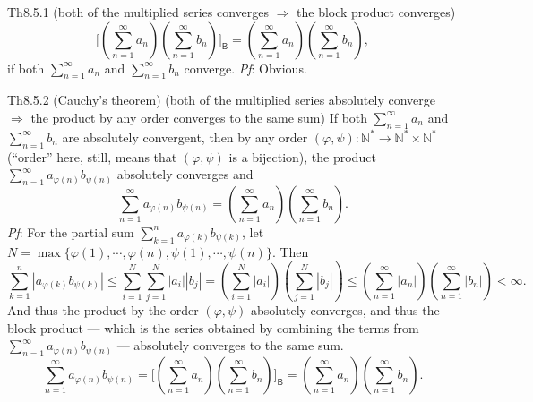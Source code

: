 \documentclass{article}
\begin{document}
\begin{Th}{Th8.5.1 (both of the multiplied series converges $\Rightarrow$ the block product converges)}
    $$ \Bigg[\left(\sum_{n=1}^{\infty} a_n\right) \left(\sum_{n=1}^{\infty} b_n\right)\Bigg]_\mathsf{B} = \left(\sum_{n=1}^{\infty} a_n\right) \left(\sum_{n=1}^{\infty} b_n\right), $$
    if both $\sum_{n=1}^{\infty} a_n$ and $\sum_{n=1}^{\infty} b_n$ converge.
    \tcblower
    \textit{Pf}: Obvious.
\end{Th}

\begin{Th}{Th8.5.2 (Cauchy's theorem) (both of the multiplied series absolutely converge $\Rightarrow$ the product by any order converges to the same sum)}
    If both $\sum_{n=1}^{\infty} a_n$ and $\sum_{n=1}^{\infty} b_n$ are absolutely convergent, then by any \textcolor{Df}{order $(\varphi, \psi): \mathbb{N}^\ast \rightarrow \mathbb{N}^\ast\times\mathbb{N}^\ast$ (``order'' here, still, means that $(\varphi, \psi)$ is a bijection)}, the product $ \sum_{n=1}^{\infty} a_{\varphi(n)} b_{\psi(n)} $ absolutely converges and
    $$ \sum_{n=1}^{\infty} a_{\varphi(n)} b_{\psi(n)} = \left(\sum_{n=1}^{\infty} a_n\right) \left(\sum_{n=1}^{\infty} b_n\right). $$
    \tcblower
    \textit{Pf}: For the partial sum $ \sum_{k=1}^{n} a_{\varphi(k)} b_{\psi(k)} $, let $N = \max\{\varphi(1), \cdots, \varphi(n), \psi(1), \cdots, \psi(n)\}$. Then
    $$ \sum_{k=1}^{n} |a_{\varphi(k)} b_{\psi(k)}| \leq \sum_{i=1}^{N} \sum_{j=1}^{N} |a_i| |b_j| = \left(\sum_{i=1}^{N} |a_i|\right) \left(\sum_{j=1}^{N} |b_j|\right) \leq \left(\sum_{n=1}^{\infty} |a_n|\right) \left(\sum_{n=1}^{\infty} |b_n|\right) < \infty. $$
    And thus the product by the order $(\varphi, \psi)$ absolutely converges, and thus the block product — which is the series obtained by combining the terms from $\sum_{n=1}^{\infty} a_{\varphi(n)} b_{\psi(n)}$ — absolutely converges to the same sum.
    $$ \sum_{n=1}^{\infty} a_{\varphi(n)} b_{\psi(n)} = \Bigg[\left(\sum_{n=1}^{\infty} a_n\right) \left(\sum_{n=1}^{\infty} b_n\right)\Bigg]_\mathsf{B} = \left(\sum_{n=1}^{\infty} a_n\right) \left(\sum_{n=1}^{\infty} b_n\right). $$
\end{Th}
\end{document}
